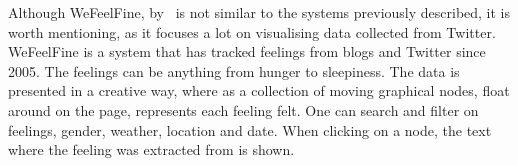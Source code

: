 Although WeFeelFine, by~\cite{article:wefeelfine} is not similar to the systems previously described, it is worth mentioning, as it focuses a lot on visualising data collected from Twitter. WeFeelFine is a system that has tracked feelings from blogs and Twitter since 2005. The feelings can be anything from hunger to sleepiness. The data is presented in a creative way, where as a collection of moving graphical nodes, float around on the page, represents each feeling felt. One can search and filter on feelings, gender, weather, location and date. When clicking on a node, the text where the feeling was extracted from is shown. 